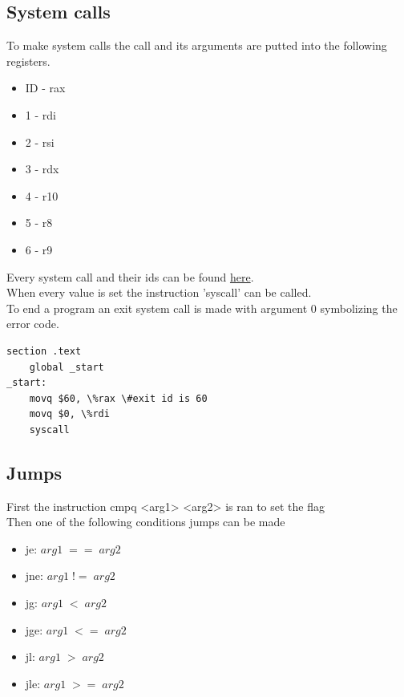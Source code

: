 \documentclass[12pt, a4paper]{article}
\begin{document}
		\subsection{System calls}
			To make system calls the call and its arguments are putted into the following registers.\\
			\begin{itemize}
				\item ID - rax
				\item 1 - rdi
				\item 2 - rsi
				\item 3 - rdx
				\item 4 - r10
				\item 5 - r8
				\item 6 - r9
			\end{itemize}
			Every system call and their ids can be found \href{https://filippo.io/linux-syscall-table/}{here}.\\
			When every value is set the instruction 'syscall' can be called.\\[4mm]
			
			To end a program an exit system call is made with argument 0 symbolizing the error code.\\
			\begin{lstlisting}[language={[x86masm]Assembler}]
section .text
	global _start
_start:
	movq $60, \%rax \#exit id is 60
	movq $0, \%rdi
	syscall \end{lstlisting}
		\subsection{Jumps}
			First the instruction cmpq <arg1> <arg2> is ran to set the flag\\
			Then one of the following conditions jumps can be made
			\begin{itemize}
				\item je: $arg1\; ==\; arg2$
				\item jne: $arg1\; !=\; arg2$
				\item jg: $arg1\; <\; arg2$
				\item jge: $arg1\; <=\; arg2$
				\item jl: $arg1\; >\; arg2$
				\item jle: $arg1\; >=\; arg2$
			\end{itemize}
\end{document}
